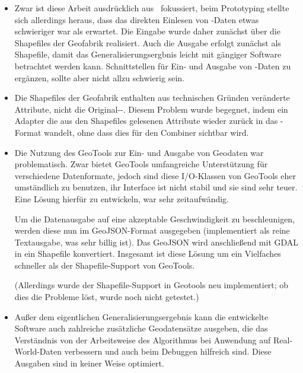 \documentclass[../main/thesis.tex]{subfiles}
\begin{document}
\begin{itemize}

\item
Zwar ist diese Arbeit ausdrücklich aus \osm\ fokussiert, beim Prototyping stellte sich allerdings heraus, dass das direkten Einlesen von \osm-Daten etwas schwieriger war als erwartet.
Die Eingabe wurde daher zunächst über die Shapefiles der Geofabrik realisiert.
Auch die Ausgabe erfolgt zunächst als Shapefile, damit das Generalisierungsergbnis leicht mit gängiger Software betrachtet werden kann.
Schnittstellen für Ein- und Ausgabe von \osm-Daten zu ergänzen, sollte aber nicht allzu schwierig sein.

\item
Die Shapefiles der Geofabrik enthalten aus technischen Gründen veränderte Attribute, nicht die Original-\osm-.
Diesem Problem wurde begegnet, indem ein Adapter die aus den Shapefiles gelesenen Attribute wieder zurück in das \osm-Format wandelt, ohne dass dies für den Combiner sichtbar wird.

\item
Die Nutzung des  GeoTools zur Ein- und Ausgabe von Geodaten war problematisch.
Zwar bietet GeoTools umfangreiche Unterstützung für verschiedene Datenformate, jedoch sind diese I/O-Klassen von GeoTools eher umständlich zu benutzen, ihr Interface ist nicht stabil und sie sind sehr teuer.
Eine Lösung hierfür zu entwickeln, war sehr zeitaufwändig.

Um die Datenausgabe auf eine akzeptable Geschwindigkeit zu beschleunigen, werden diese nun im GeoJSON-Format ausgegeben (implementiert als reine Textausgabe, was sehr billig ist).
Das GeoJSON wird anschließend mit GDAL in ein Shapefile konvertiert.
Insgesamt ist diese Lösung um ein Vielfaches schneller als der Shapefile-Support von GeoTools.

(Allerdings wurde der Shapefile-Support in Geotools neu implementiert; ob dies die Probleme löst, wurde noch nicht getestet.)

\item
Außer dem eigentlichen Generalisierungsergebnis kann die entwickelte Software auch zahlreiche zusätzliche Geodatensätze ausgeben, die das Verständnis von der Arbeitsweise des Algorithmus bei Anwendung auf Real-World-Daten verbessern und auch beim Debuggen hilfreich sind.
Diese Ausgaben sind in keiner Weise optimiert.

\end{itemize}
\end{document}
